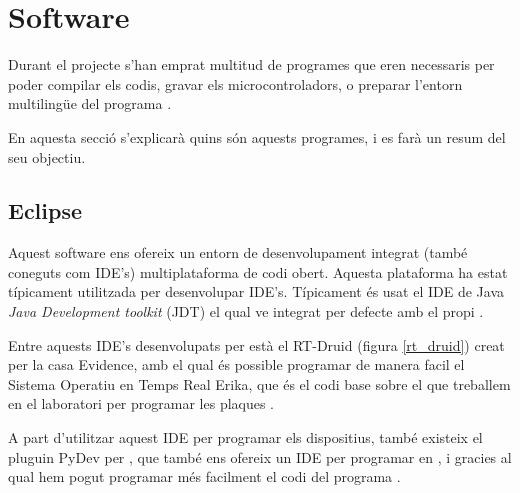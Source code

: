 
\FloatBarrier

\section{Software}\label{cap:tec:soft}

Durant el projecte s'han emprat multitud de programes que eren necessaris per poder compilar els codis, gravar els microcontroladors, o preparar l'entorn multilingüe del programa \DCSMonitor.

En aquesta secció s'explicarà quins són aquests programes, i es farà un resum del seu objectiu.

\subsection{Eclipse}\label{cap:tec:soft:eclipse}


Aquest software ens ofereix un entorn de desenvolupament integrat (també coneguts com IDE's) multiplataforma de codi obert. Aquesta plataforma ha estat típicament utilitzada per desenvolupar IDE's. Típicament és usat el IDE de Java \emph{Java Development toolkit} (JDT) el qual ve integrat per defecte amb el propi \Eclipse.

Entre aquests IDE's desenvolupats per \Eclipse està el RT-Druid (figura \ref{rt_druid}) creat per la casa Evidence, amb el qual és possible programar de manera facil el Sistema Operatiu en Temps Real Erika, que és el codi base sobre el que treballem en el laboratori per programar les plaques \FLEX.

A part d'utilitzar aquest IDE per programar els dispositius, també existeix el pluguin PyDev per \Eclipse, que també ens ofereix un IDE per programar en \Python, i gracies al qual hem pogut programar més facilment el codi del programa \DCSMonitor.


